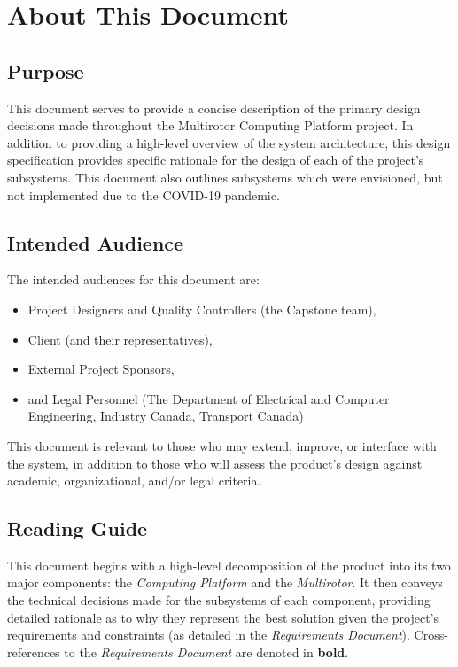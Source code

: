 \documentclass[10pt,letterpaper]{article}
\begin{document}


\section{About This Document}
\subsection{Purpose}
This document serves to provide a concise description of the primary design decisions made throughout the Multirotor Computing Platform project. In addition to providing a high-level overview of the system architecture, this design specification provides specific rationale for the design of each of the project's subsystems. This document also outlines subsystems which were envisioned, but not implemented due to the COVID-19 pandemic.

\subsection{Intended Audience}

The intended audiences for this document are:
\begin{itemize}
\item Project Designers and Quality Controllers (the Capstone team),
\item Client (and their representatives),
\item External Project Sponsors,
\item and Legal Personnel (The Department of Electrical and Computer Engineering, Industry Canada, Transport Canada)
\end{itemize}

This document is relevant to those who may extend, improve, or interface with the system, in addition to those who will assess the product's design against academic, organizational, and/or legal criteria.

\subsection{Reading Guide}

This document begins with a high-level decomposition of the product into its two major components: the \textit{Computing Platform} and the \textit{Multirotor}. It then conveys the technical decisions made for the subsystems of each component, providing detailed rationale as to why they represent the best solution given the project's requirements and constraints (as detailed in the \textit{Requirements Document}). Cross-references to the \textit{Requirements Document} are denoted in \textbf{bold}.
\end{document}
